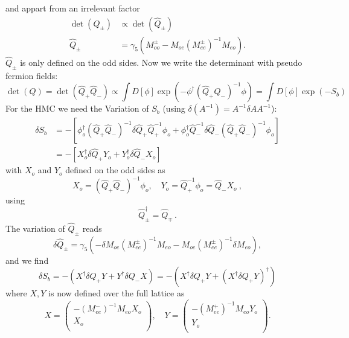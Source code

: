 and appart from an irrelevant factor
\begin{equation}
  \label{eq:eo4}
  \begin{split}
    \det(Q_\pm) &\propto \det(\hat Q_\pm) \\
    \hat Q_\pm &= \gamma_5(M_{oo}^\pm - M_{oe}(M_{ee}^\pm )^{-1}M_{eo}). 
  \end{split}
\end{equation}
$\hat Q_\pm$ is only defined on the odd sides. Now we write the
determinant with pseudo fermion fields:
\[
\det(Q) = \det(\hat Q_+ \hat Q_-) \propto \int D[\phi]\exp(-\phi^\dagger (\hat Q_+ \hat Q_-)^{-1} \phi) = \int D[\phi]\exp(-S_b)
\]
For the HMC we need the Variation of $S_b$ (using $\delta (A^{-1})=A^{-1}\delta A A^{-1}$):
\begin{equation}
  \label{eq:eo5}
  \begin{split}
    \delta S_b &= -[\phi_o^\dagger (\hat Q_+ \hat Q_-)^{-1}\delta \hat Q_+ \hat Q_+^{-1}\phi_o +
    \phi_o^\dagger\hat Q_-^{-1}\delta \hat Q_- (\hat Q_+ \hat Q_-)^{-1} \phi_o ] \\
     &= -[X_o^\dagger \delta \hat Q_+ Y_o + Y_o^\dagger \delta\hat Q_- X_o]
  \end{split}
\end{equation}
with $X_o$ and $Y_o$ defined on the odd sides as 
\begin{equation}
  \label{eq:eo6}
  X_o = (\hat Q_+ \hat Q_-)^{-1} \phi_o,\quad Y_o = \hat Q_+^{-1}\phi_o=\hat
  Q_-X_o\ ,
\end{equation}
using
\[
\hat Q_\pm^\dagger = \hat Q_\mp\, .
\]
The variation of $\hat Q_\pm$ reads
\begin{equation}
  \label{eq:eo7}
  \delta \hat Q_\pm = \gamma_5\left(-\delta M_{oe}(M_{ee}^\pm )^{-1}M_{eo} -
    M_{oe}(M_{ee}^\pm )^{-1}\delta M_{eo}\right),
\end{equation}
and we find
\begin{equation}
  \label{eq:eo8}
  \delta S_b = -(X^\dagger\delta Q_+ Y + Y^\dagger\delta Q_- X) = -(X^\dagger\delta Q_+ Y +(X^\dagger\delta Q_+ Y)^\dagger)
\end{equation}
where $X,Y$ is now defined over the full lattice as
\begin{equation}
  \label{eq:eo9}
  X = 
  \begin{pmatrix}
    -(M_{ee}^-)^{-1}M_{eo}X_o \\ X_o\\
  \end{pmatrix},\quad
  Y = 
  \begin{pmatrix}
    -(M_{ee}^+)^{-1}M_{eo}Y_o \\ Y_o\\
  \end{pmatrix}.
\end{equation}
